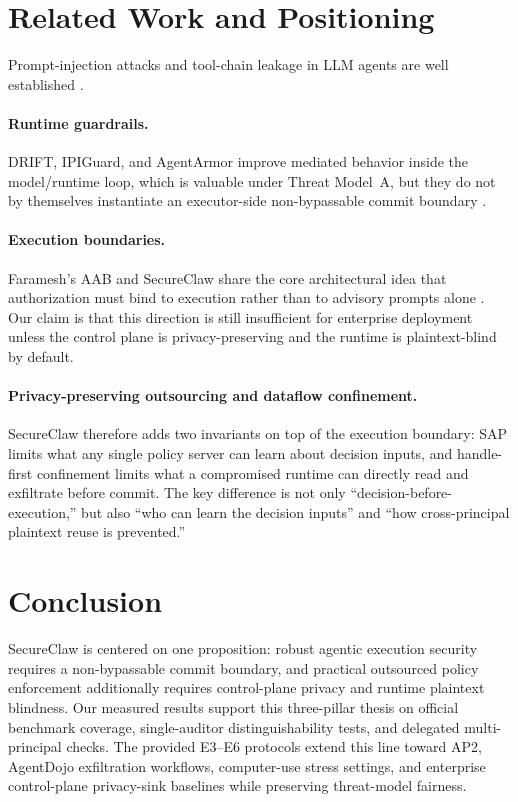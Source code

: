 \section{Related Work and Positioning}
\label{sec:related}

Prompt-injection attacks and tool-chain leakage in LLM agents are well established \citep{greshake2023indirect,injecagent2024,toolselect2025,stac2025,agentdojo2024,agentleak2026}.

\paragraph{Runtime guardrails.}
DRIFT, IPIGuard, and AgentArmor improve mediated behavior inside the model/runtime loop, which is valuable under Threat Model~A, but they do not by themselves instantiate an executor-side non-bypassable commit boundary \citep{drift2025,ipiguard2025,agentarmor2025}.

\paragraph{Execution boundaries.}
Faramesh's AAB and SecureClaw share the core architectural idea that authorization must bind to execution rather than to advisory prompts alone \citep{faramesh2026}.
Our claim is that this direction is still insufficient for enterprise deployment unless the control plane is privacy-preserving and the runtime is plaintext-blind by default.

\paragraph{Privacy-preserving outsourcing and dataflow confinement.}
SecureClaw therefore adds two invariants on top of the execution boundary: SAP limits what any single policy server can learn about decision inputs, and handle-first confinement limits what a compromised runtime can directly read and exfiltrate before commit.
The key difference is not only ``decision-before-execution,'' but also ``who can learn the decision inputs'' and ``how cross-principal plaintext reuse is prevented.''

\section{Conclusion}
\label{sec:conclusion}

SecureClaw is centered on one proposition: robust agentic execution security requires a non-bypassable commit boundary, and practical outsourced policy enforcement additionally requires control-plane privacy and runtime plaintext blindness.
Our measured results support this three-pillar thesis on official benchmark coverage, single-auditor distinguishability tests, and delegated multi-principal checks.
The provided E3--E6 protocols extend this line toward AP2, AgentDojo exfiltration workflows, computer-use stress settings, and enterprise control-plane privacy-sink baselines while preserving threat-model fairness.
